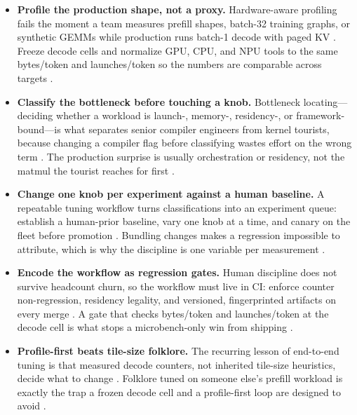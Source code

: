 \begin{itemize}
\item \textbf{Profile the production shape, not a proxy.}
Hardware-aware profiling fails the moment a team measures prefill shapes, batch-32 training graphs, or synthetic GEMMs while production runs batch-1 decode with paged KV \citep{kwon2023vllm,patel2025llminference}. Freeze decode cells and normalize GPU, CPU, and NPU tools to the same bytes/token and launches/token so the numbers are comparable across targets \citep{memoryfloor2026,taxbreak2026}.

\item \textbf{Classify the bottleneck before touching a knob.}
Bottleneck locating---deciding whether a workload is launch-, memory-, residency-, or framework-bound---is what separates senior compiler engineers from kernel tourists, because changing a compiler flag before classifying wastes effort on the wrong term \citep{patel2025llminference,dlbook}. The production surprise is usually orchestration or residency, not the matmul the tourist reaches for first \citep{nvidia2024cudagraphs,taxbreak2026}.

\item \textbf{Change one knob per experiment against a human baseline.}
A repeatable tuning workflow turns classifications into an experiment queue: establish a human-prior baseline, vary one knob at a time, and canary on the fleet before promotion \citep{chen2020compilerbasedhardw,yirage2026}. Bundling changes makes a regression impossible to attribute, which is why the discipline is one variable per measurement \citep{patel2025llminference}.

\item \textbf{Encode the workflow as regression gates.}
Human discipline does not survive headcount churn, so the workflow must live in CI: enforce counter non-regression, residency legality, and versioned, fingerprinted artifacts on every merge \citep{chen2020compilerbasedhardw,yirage2026}. A gate that checks bytes/token and launches/token at the decode cell is what stops a microbench-only win from shipping \citep{memoryfloor2026,taxbreak2026}.

\item \textbf{Profile-first beats tile-size folklore.}
The recurring lesson of end-to-end tuning is that measured decode counters, not inherited tile-size heuristics, decide what to change \citep{patel2025llminference,dlbook}. Folklore tuned on someone else's prefill workload is exactly the trap a frozen decode cell and a profile-first loop are designed to avoid \citep{semianalysis2024tma}.
\end{itemize}

